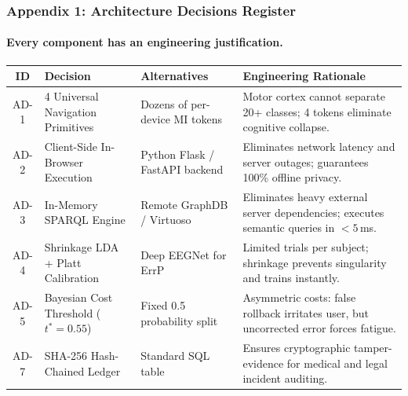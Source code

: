 \documentclass[aspectratio=169,10pt]{beamer}
\begin{document}
\begin{frame}
    \frametitle{Appendix 1: Architecture Decisions Register}
    \framesubtitle{Every component has an engineering justification.}
    \tiny
    \begin{tabularx}{\textwidth}{c p{3.2cm} p{3.2cm} X}
        \toprule
        \textbf{ID} & \textbf{Decision} & \textbf{Alternatives} & \textbf{Engineering Rationale} \\
        \midrule
        AD-1 & 4 Universal Navigation Primitives & Dozens of per-device MI tokens & Motor cortex cannot separate 20+ classes; 4 tokens eliminate cognitive collapse. \\
        AD-2 & Client-Side In-Browser Execution & Python Flask / FastAPI backend & Eliminates network latency and server outages; guarantees 100\% offline privacy. \\
        AD-3 & In-Memory SPARQL Engine & Remote GraphDB / Virtuoso & Eliminates heavy external server dependencies; executes semantic queries in $< 5$\,ms. \\
        AD-4 & Shrinkage LDA + Platt Calibration & Deep EEGNet for ErrP & Limited trials per subject; shrinkage prevents singularity and trains instantly. \\
        AD-5 & Bayesian Cost Threshold ($t^* = 0.55$) & Fixed 0.5 probability split & Asymmetric costs: false rollback irritates user, but uncorrected error forces fatigue. \\
        AD-7 & SHA-256 Hash-Chained Ledger & Standard SQL table & Ensures cryptographic tamper-evidence for medical and legal incident auditing. \\
        \bottomrule
    \end{tabularx}
\end{frame}
\end{document}
